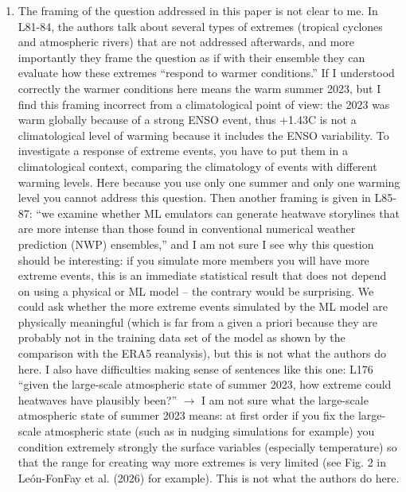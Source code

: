 \documentclass[11pt]{article}
\newcommand{\newTxt}{\textcolor{cadmiumgreen}}
\begin{document}
\begin{enumerate}
    \item The framing of the question addressed in this paper is not clear to me. In L81-84, the authors talk about several types of extremes (tropical cyclones and atmospheric rivers) that are not addressed afterwards, and more importantly they frame the question as if with their ensemble they can evaluate how these extremes “respond to warmer conditions.” If I understood correctly the warmer conditions here means the warm summer 2023, but I find this framing incorrect from a climatological point of view: the 2023 was warm globally because of a strong ENSO event, thus +1.43C is not a climatological level of warming because it includes the ENSO variability. To investigate a response of extreme events, you have to put them in a climatological context, comparing the climatology of events with different warming levels. Here because you use only one summer and only one warming level you cannot address this question. Then another framing is given in L85-87: “we examine whether ML emulators can generate heatwave storylines that are more intense than those found in conventional numerical weather prediction (NWP) ensembles,'' and I am not sure I see why this question should be interesting: if you simulate more members you will have more extreme events, this is an immediate statistical result that does not depend on using a physical or ML model – the contrary would be surprising. We could ask whether the more extreme events simulated by the ML model are physically meaningful (which is far from a given a priori because they are probably not in the training data set of the model as shown by the comparison with the ERA5 reanalysis), but this is not what the authors do here. I also have difficulties making sense of sentences like this one: L176 “given the large-scale atmospheric state of summer 2023, how extreme could heatwaves have plausibly been?” $\rightarrow$ I am not sure what the large-scale atmospheric state of summer 2023 means: at first order if you fix the large-scale atmospheric state (such as in nudging simulations for example) you condition extremely strongly the surface variables (especially temperature) so that the range for creating way more extremes is very limited (see Fig. 2 in León-FonFay et al. (2026) for example). This is not what the authors do here.



\end{enumerate}
\end{document}
